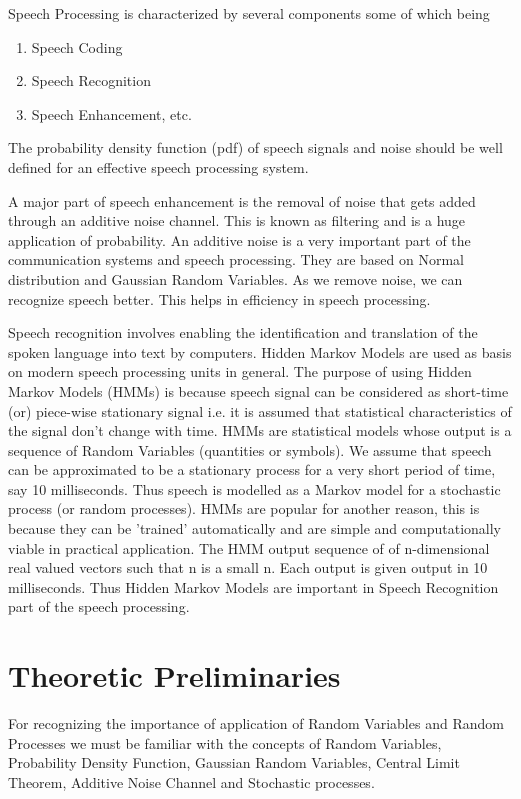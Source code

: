 \documentclass[10pt,twocolumn,letterpaper]{article}
\begin{document}
Speech Processing is characterized by several components some of which being
\begin{enumerate}
    \item Speech Coding
    \item Speech Recognition
    \item Speech Enhancement, etc.
\end{enumerate}
The probability density function (pdf) of speech signals and noise should be well defined for an effective speech processing system. 
\vspace{0.35cm}
\par A major part of speech enhancement is the removal of noise that gets added through an additive noise channel. This is known as filtering and is a huge application of probability. An additive noise is a very important part of the communication systems and speech processing. They are based on Normal distribution and Gaussian Random Variables. As we remove noise, we can recognize speech better. This helps in efficiency in speech processing. 
\vspace{0.35cm}
\par Speech recognition involves enabling the identification and translation of the spoken language into text by computers. Hidden Markov Models are used as basis on modern speech processing units in general. The purpose of using Hidden Markov Models (HMMs) is because speech signal can be considered as short-time (or) piece-wise stationary signal i.e. it is assumed that statistical characteristics of the signal don't change with time. HMMs are statistical models whose output is a sequence of Random Variables (quantities or symbols). We assume that speech can be approximated to be a stationary process for a very short period of time, say 10 milliseconds. Thus speech is modelled as a Markov model for a stochastic process (or random processes). 
 HMMs are popular for another reason, this is because they can be 'trained' automatically and are simple and computationally viable in practical application. The HMM output sequence of of n-dimensional real valued vectors such that n is a small n. Each output is given output in 10 milliseconds. Thus Hidden Markov Models are important in Speech Recognition part of the speech processing.




\section{\textbf{Theoretic Preliminaries}}
For recognizing the importance of application of Random Variables and Random Processes we must be familiar with the concepts of Random Variables, Probability Density Function, Gaussian Random Variables, Central Limit Theorem, Additive Noise Channel and Stochastic processes. 
\end{document}
